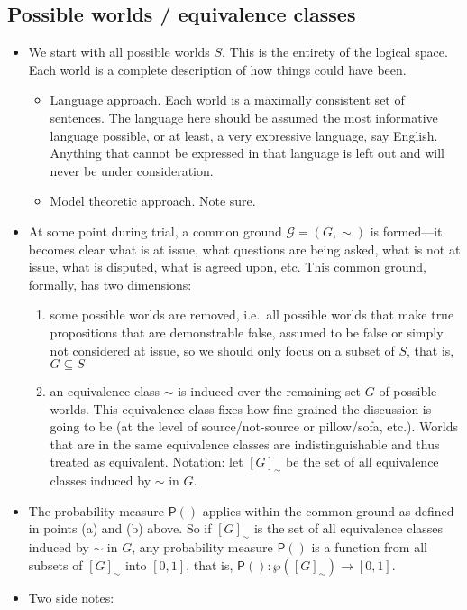 \documentclass[
  11pt,
  dvipsnames,enabledeprecatedfontcommands]{scrartcl}
\providecommand{\tightlist}{%
  \setlength{\itemsep}{0pt}\setlength{\parskip}{0pt}}
\newcommand{\pr}[1]{\ensuremath{\mathsf{P}(#1)}}
\begin{document}
\hypertarget{possible-worlds-equivalence-classes}{%
\subsection{Possible worlds / equivalence
classes}\label{possible-worlds-equivalence-classes}}

\begin{itemize}
\item
  We start with all possible worlds \(S\). This is the entirety of the
  logical space. Each world is a complete description of how things
  could have been.

  \begin{itemize}
  \tightlist
  \item
    Language approach. Each world is a maximally consistent set of
    sentences. The language here should be assumed the most informative
    language possible, or at least, a very expressive language, say
    English. Anything that cannot be expressed in that language is left
    out and will never be under consideration.
  \item
    Model theoretic approach. Note sure.
  \end{itemize}
\item
  At some point during trial, a common ground \(\mathcal{G}=(G, \sim)\)
  is formed---it becomes clear what is at issue, what questions are
  being asked, what is not at issue, what is disputed, what is agreed
  upon, etc. This common ground, formally, has two dimensions:

  \begin{enumerate}
  \def\labelenumi{\alph{enumi}.}
  \tightlist
  \item
    some possible worlds are removed, i.e.~all possible worlds that make
    true propositions that are demonstrable false, assumed to be false
    or simply not considered at issue, so we should only focus on a
    subset of \(S\), that is, \(G\subseteq S\)
  \item
    an equivalence class \(\sim\) is induced over the remaining set
    \(G\) of possible worlds. This equivalence class fixes how fine
    grained the discussion is going to be (at the level of
    source/not-source or pillow/sofa, etc.). Worlds that are in the same
    equivalence classes are indistinguishable and thus treated as
    equivalent. Notation: let \([G]_\sim\) be the set of all equivalence
    classes induced by \(\sim\) in \(G\).
  \end{enumerate}
\item
  The probability measure \(\pr{}\) applies within the common ground as
  defined in points (a) and (b) above. So if \([G]_\sim\) is the set of
  all equivalence classes induced by \(\sim\) in \(G\), any probability
  measure \(\pr{}\) is a function from all subsets of \([G]_\sim\) into
  \([0, 1]\), that is, \(\pr{}: \wp([G]_\sim)\to [0,1]\).
\item
  Two side notes:


\end{itemize}
\end{document}
